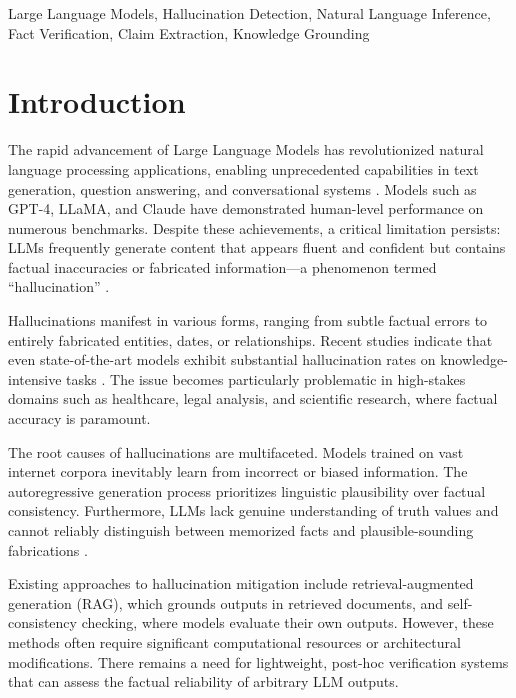 \documentclass[conference]{IEEEtran}
\begin{document}
\begin{IEEEkeywords}
Large Language Models, Hallucination Detection, Natural Language Inference, Fact Verification, Claim Extraction, Knowledge Grounding
\end{IEEEkeywords}

\section{Introduction}

The rapid advancement of Large Language Models has revolutionized natural language processing applications, enabling unprecedented capabilities in text generation, question answering, and conversational systems \cite{survey_hallucination}. Models such as GPT-4, LLaMA, and Claude have demonstrated human-level performance on numerous benchmarks. Despite these achievements, a critical limitation persists: LLMs frequently generate content that appears fluent and confident but contains factual inaccuracies or fabricated information—a phenomenon termed ``hallucination'' \cite{why_hallucinate}.

Hallucinations manifest in various forms, ranging from subtle factual errors to entirely fabricated entities, dates, or relationships. Recent studies indicate that even state-of-the-art models exhibit substantial hallucination rates on knowledge-intensive tasks \cite{semantic_entropy}. The issue becomes particularly problematic in high-stakes domains such as healthcare, legal analysis, and scientific research, where factual accuracy is paramount.

The root causes of hallucinations are multifaceted. Models trained on vast internet corpora inevitably learn from incorrect or biased information. The autoregressive generation process prioritizes linguistic plausibility over factual consistency. Furthermore, LLMs lack genuine understanding of truth values and cannot reliably distinguish between memorized facts and plausible-sounding fabrications \cite{survey_hallucination}.

Existing approaches to hallucination mitigation include retrieval-augmented generation (RAG), which grounds outputs in retrieved documents, and self-consistency checking, where models evaluate their own outputs. However, these methods often require significant computational resources or architectural modifications. There remains a need for lightweight, post-hoc verification systems that can assess the factual reliability of arbitrary LLM outputs.
\end{document}
